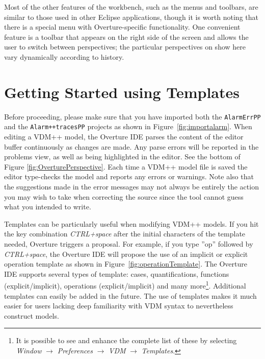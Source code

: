 Most of the other features of the workbench, such as the menus and
toolbars, are similar to those used in other Eclipse applications,
though it is worth noting that there is a special menu with
Overture-specific functionality. One convenient feature is a toolbar
that appears on the right side of the screen and allows the user to
switch between perspectives; the particular perspectives on show here
vary dynamically according to history.



\section{Getting Started using Templates}\label{sec:templates}

Before proceeding, please make sure that you have imported both the
\texttt{AlarmErrPP} and the \texttt{Alarm++tracesPP} projects as shown in
Figure~\ref{fig:importalarm}. When editing a VDM++ model, the Overture IDE parses the content of the
editor buffer continuously as changes are made. Any parse errors will
be reported in the problems view, as well as being highlighted in the
editor. See the bottom of Figure
\ref{fig:OverturePerspective}. Each time a VDM++ model file is
saved the editor type-checks the model and reports any errors or
warnings. Note also that the suggestions made in the error messages
may not always be entirely the action you may wish to take when
correcting the source since the tool cannot guess what you intended
to write.

Templates can be particularly useful when modifying VDM++ models. If you hit
the key combination \textit{CTRL+space} after the initial characters
of the template needed, Overture triggers a proposal. For example, if
you type ''op'' followed by \textit{CTRL+space}, the Overture IDE
will propose the use of an implicit or explicit operation template as
shown in Figure~\ref{fig:operationTemplate}. The Overture IDE
supports several types of template: cases, quantifications, functions
(explicit/implicit), operations (explicit/implicit) and many
more\footnote{It is possible to see and enhance the complete list of
  these by selecting \emph{Window} $\rightarrow$ \emph{Preferences}
  $\rightarrow$ \emph{VDM}  $\rightarrow$ \emph{Templates}.}.
Additional templates can easily be added in the future. The use
of templates makes it much easier for users lacking deep familiarity
with VDM syntax to nevertheless construct models.

